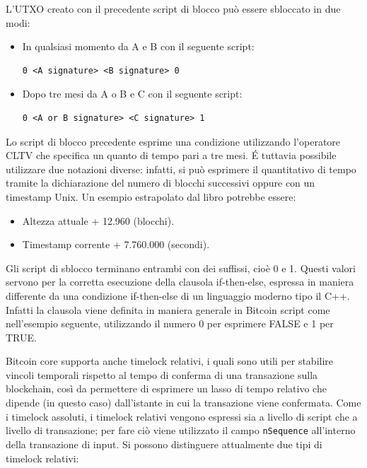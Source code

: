 

L’UTXO creato con il precedente script di blocco può essere sbloccato in due modi:
\begin{itemize}
  \item In qualsiasi momento  da A e B con il seguente script:
  \begin{lstlisting}[language=bitcoinscript]
   0 <A signature> <B signature> 0
  \end{lstlisting}
  \item Dopo tre mesi da A o B e C con il seguente script:
  \begin{lstlisting}[language=bitcoinscript]
   0 <A or B signature> <C signature> 1
  \end{lstlisting}
\end{itemize}

Lo script di blocco precedente esprime una condizione utilizzando l’operatore CLTV che specifica un quanto di tempo pari a tre mesi. \'E tuttavia possibile utilizzare due notazioni diverse: infatti, si può esprimere il quantitativo di tempo tramite la dichiarazione del numero di blocchi successivi oppure con un timestamp Unix. Un esempio estrapolato dal libro \cite{bitcoinbook} potrebbe essere:
\begin{itemize}
  \item Altezza attuale + 12.960 (blocchi).
  \item Timestamp corrente + 7.760.000 (secondi).
\end{itemize}

Gli script di sblocco terminano entrambi con dei suffissi, cioè 0 e 1. Questi valori servono per la corretta esecuzione della clausola if-then-else, espressa in maniera differente da una condizione if-then-else di un linguaggio moderno tipo il C++. Infatti la clausola viene definita in maniera generale in Bitcoin script come nell’esempio seguente, utilizzando il numero 0 per esprimere FALSE e 1 per TRUE.



Bitcoin core supporta anche timelock relativi, i quali sono utili per stabilire vincoli temporali rispetto al tempo di conferma di una transazione sulla blockchain, così da permettere di esprimere un lasso di tempo relativo che dipende (in questo caso) dall’istante in cui la transazione viene confermata.
Come i timelock assoluti, i timelock relativi vengono espressi sia a livello di script che a livello di transazione; per fare ciò viene utilizzato il campo {\tt{nSequence}} all’interno della transazione di input.
Si possono distinguere attualmente due tipi di timelock relativi:


